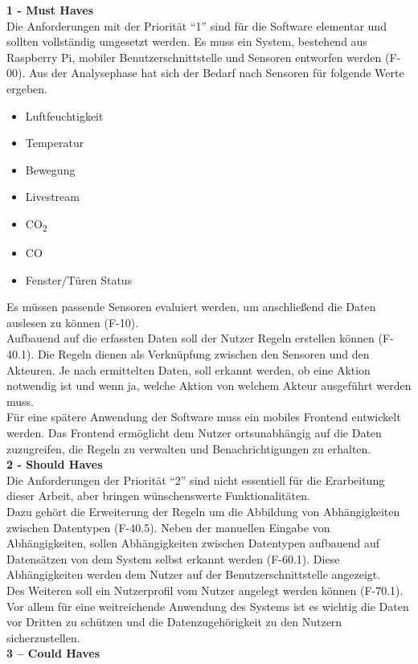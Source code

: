 \textbf{1 - Must Haves}\\
Die Anforderungen mit der Priorität ``1'' sind für die Software elementar und sollten vollständig umgesetzt werden. 
Es muss ein System, bestehend aus Raspberry Pi, mobiler Benutzerschnittstelle und Sensoren entworfen werden (F-00). Aus der Analysephase hat sich der Bedarf nach Sensoren für folgende Werte ergeben.
\begin{itemize}
	\item Luftfeuchtigkeit
	\item Temperatur
	\item Bewegung
	\item Livestream
	\item CO\textsubscript{2}
	\item CO
	\item Fenster/Türen Status
\end{itemize}
Es müssen passende Sensoren evaluiert werden, um anschließend die Daten auslesen zu können (F-10).\\
Aufbauend auf die erfassten Daten soll der Nutzer Regeln erstellen können (F-40.1). Die Regeln dienen als Verknüpfung zwischen den Sensoren und den Akteuren. Je nach ermittelten Daten, soll erkannt werden, ob eine Aktion notwendig ist und wenn ja, welche Aktion von welchem Akteur ausgeführt werden muss.\\
Für eine spätere Anwendung der Software muss ein mobiles Frontend entwickelt werden. Das Frontend ermöglicht dem Nutzer ortsunabhängig auf die Daten zuzugreifen, die Regeln zu verwalten und Benachrichtigungen zu erhalten.\\
\textbf{2 - Should Haves}\\
Die Anforderungen der Priorität ``2'' sind nicht essentiell für die Erarbeitung dieser Arbeit, aber bringen wünschenswerte Funktionalitäten.\\
Dazu gehört die Erweiterung der Regeln um die Abbildung von Abhängigkeiten zwischen Datentypen (F-40.5). Neben der manuellen Eingabe von Abhängigkeiten, sollen Abhängigkeiten zwischen Datentypen aufbauend auf Datensätzen von dem System selbst erkannt werden (F-60.1). Diese Abhängigkeiten werden dem Nutzer auf der Benutzerschnittstelle angezeigt.\\
Des Weiteren soll ein Nutzerprofil vom Nutzer angelegt werden können (F-70.1). Vor allem für eine weitreichende Anwendung des Systems ist es wichtig die Daten vor Dritten zu schützen und die Datenzugehörigkeit zu den Nutzern sicherzustellen.\\
\textbf{3 – Could Haves}\\
